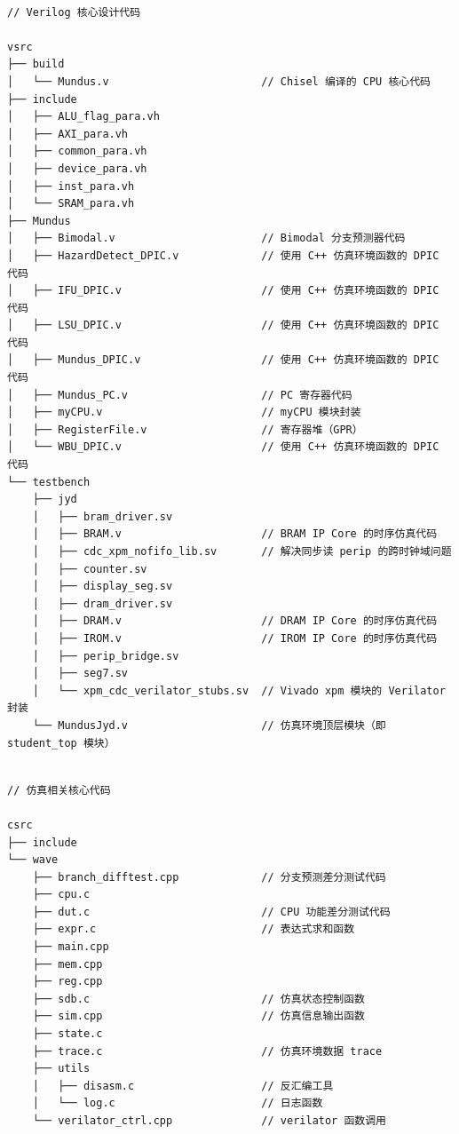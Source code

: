 \documentclass[UTF8,a4paper,zihao=-4]{ctexart}
\begin{document}
\begin{minipage}{\linewidth}
\begin{Verbatim}[fontsize=\small]

// Verilog 核心设计代码

vsrc
├── build
│   └── Mundus.v                        // Chisel 编译的 CPU 核心代码
├── include
│   ├── ALU_flag_para.vh
│   ├── AXI_para.vh
│   ├── common_para.vh
│   ├── device_para.vh
│   ├── inst_para.vh
│   └── SRAM_para.vh
├── Mundus
│   ├── Bimodal.v                       // Bimodal 分支预测器代码
│   ├── HazardDetect_DPIC.v             // 使用 C++ 仿真环境函数的 DPIC 代码
│   ├── IFU_DPIC.v                      // 使用 C++ 仿真环境函数的 DPIC 代码
│   ├── LSU_DPIC.v                      // 使用 C++ 仿真环境函数的 DPIC 代码
│   ├── Mundus_DPIC.v                   // 使用 C++ 仿真环境函数的 DPIC 代码
│   ├── Mundus_PC.v                     // PC 寄存器代码
│   ├── myCPU.v                         // myCPU 模块封装
│   ├── RegisterFile.v                  // 寄存器堆（GPR）
│   └── WBU_DPIC.v                      // 使用 C++ 仿真环境函数的 DPIC 代码
└── testbench
    ├── jyd
    │   ├── bram_driver.sv
    │   ├── BRAM.v                      // BRAM IP Core 的时序仿真代码
    │   ├── cdc_xpm_nofifo_lib.sv       // 解决同步读 perip 的跨时钟域问题
    │   ├── counter.sv
    │   ├── display_seg.sv
    │   ├── dram_driver.sv
    │   ├── DRAM.v                      // DRAM IP Core 的时序仿真代码
    │   ├── IROM.v                      // IROM IP Core 的时序仿真代码
    │   ├── perip_bridge.sv
    │   ├── seg7.sv
    │   └── xpm_cdc_verilator_stubs.sv  // Vivado xpm 模块的 Verilator 封装
    └── MundusJyd.v                     // 仿真环境顶层模块（即 student_top 模块）

\end{Verbatim}
\end{minipage}

\begin{minipage}{\linewidth}
\begin{Verbatim}[fontsize=\small]

// 仿真相关核心代码

csrc
├── include
└── wave
    ├── branch_difftest.cpp             // 分支预测差分测试代码
    ├── cpu.c
    ├── dut.c                           // CPU 功能差分测试代码
    ├── expr.c                          // 表达式求和函数
    ├── main.cpp
    ├── mem.cpp
    ├── reg.cpp
    ├── sdb.c                           // 仿真状态控制函数
    ├── sim.cpp                         // 仿真信息输出函数
    ├── state.c
    ├── trace.c                         // 仿真环境数据 trace
    ├── utils
    │   ├── disasm.c                    // 反汇编工具
    │   └── log.c                       // 日志函数
    └── verilator_ctrl.cpp              // verilator 函数调用
\end{Verbatim}
\end{minipage}
\end{document}
